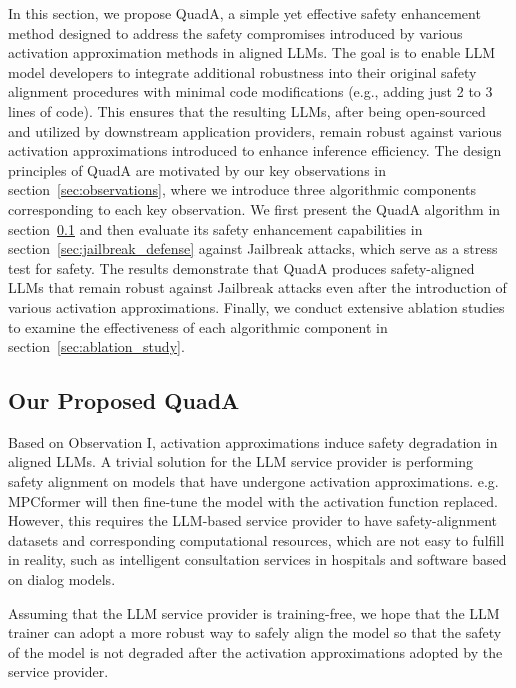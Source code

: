 In this section, we propose QuadA, a simple yet effective safety enhancement method designed to address the safety compromises introduced by various activation approximation methods in aligned LLMs. The goal is to enable LLM model developers to integrate additional robustness into their original safety alignment procedures with minimal code modifications (e.g., adding just 2 to 3 lines of code). This ensures that the resulting LLMs, after being open-sourced and utilized by downstream application providers, remain robust against various activation approximations introduced to enhance inference efficiency. The design principles of QuadA are motivated by our key observations in section~\ref{sec:observations}, where we introduce three algorithmic components corresponding to each key observation. We first present the QuadA algorithm in section~\ref{sec:quada} and then evaluate its safety enhancement capabilities in section~\ref{sec:jailbreak_defense} against Jailbreak attacks, which serve as a stress test for safety. The results demonstrate that QuadA produces safety-aligned LLMs that remain robust against Jailbreak attacks even after the introduction of various activation approximations. Finally, we conduct extensive ablation studies to examine the effectiveness of each algorithmic component in section~\ref{sec:ablation_study}.

\subsection{Our Proposed QuadA}
\label{sec:quada}

Based on Observation I, activation approximations induce safety degradation in aligned LLMs. A trivial solution for the LLM service provider is performing safety alignment on models that have undergone activation approximations. e.g. MPCformer\cite{li2022mpcformer} will then fine-tune the model with the activation function replaced. However, this requires the LLM-based service provider to have safety-alignment datasets and corresponding computational resources, which are not easy to fulfill in reality, such as intelligent consultation services in hospitals and software based on dialog models.

Assuming that the LLM service provider is training-free, we hope that the LLM trainer can adopt a more robust way to safely align the model so that the safety of the model is not degraded after the activation approximations adopted by the service provider.



